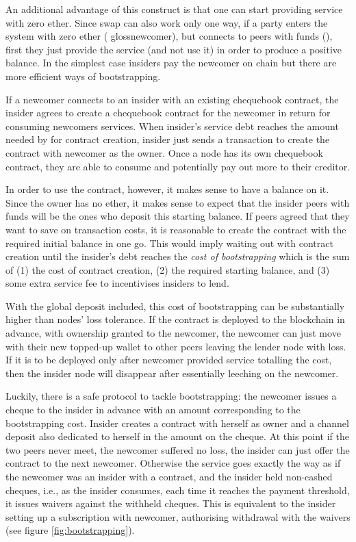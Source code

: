 An additional advantage of this construct is that one can start providing service with zero ether.
Since swap can also work only one way, if a party enters the system with zero ether (
gloss{newcomer}), but connects to peers with funds (), first they just provide the service (and not use it)
in order to produce a positive balance. In the simplest case insiders pay the newcomer on chain
but there are more efficient ways of bootstrapping.

If a newcomer connects to  an insider with an existing chequebook contract,
the insider agrees to create a chequebook contract for the newcomer
in return for consuming newcomers services.
 When insider's service debt reaches the amount needed by for contract creation,
 insider just sends a transaction to create the contract with newcomer as the owner.
Once a node has its own chequebook contract, they are able
to consume and potentially pay out more to their creditor.

In order to use the contract, however, it makes sense to have a balance on it.
Since the owner has no ether, it makes sense
to expect that the insider peers with funds will be the ones who deposit this starting balance.
If peers agreed that they want to save on transaction costs, it is reasonable to create
the contract with the required initial balance in one go. This would imply waiting out
with contract creation until the insider's debt reaches the \emph{cost of bootstrapping} which is
the sum of (1) the cost of contract creation, (2) the required starting balance, and (3) some
extra service fee to incentivises insiders to lend.

With the global deposit included, this cost of bootstrapping
can be substantially higher than nodes' loss tolerance.
If the contract is deployed to the blockchain in advance, with ownership granted
to the newcomer, the newcomer can just move with their new topped-up wallet
to other peers leaving the lender node with loss.
If it is to be deployed only after newcomer provided service totalling
the cost, then the insider node will disappear after essentially leeching on
the newcomer.

Luckily, there is a safe protocol to tackle
bootstrapping: the newcomer issues a cheque to the insider in advance with an amount
corresponding to the bootstrapping cost. Insider creates a contract with herself as owner
and a channel deposit also dedicated to herself in the amount
on the cheque. At this point if the two peers never meet, the newcomer suffered no loss,
the insider can just offer the contract to the next newcomer. Otherwise the service goes
exactly the way as if the newcomer was an insider with a contract, and the insider held
non-cashed cheques, i.e., as the insider consumes, each time it reaches the
payment threshold, it issues waivers against the withheld cheques. This is equivalent
to the insider setting up a subscription with newcomer, authorising withdrawal
with the waivers (see figure \ref{fig:bootstrapping}).

